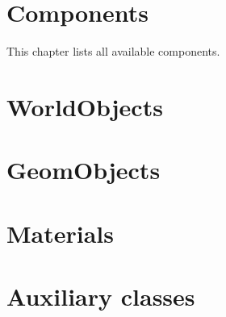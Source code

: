 \documentclass{manual}
\begin{document}



\chapter{Components \label{components}}


This chapter lists all available components.
















\chapter{WorldObjects \label{worldobjects}}

























\chapter{GeomObjects \label{geomobjects}}











\chapter{Materials \label{materials}}






\chapter{Auxiliary classes \label{auxclasses}}
\end{document}
